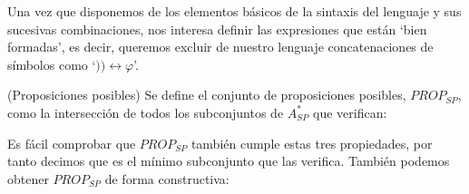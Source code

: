 Una vez que disponemos de los elementos básicos de la sintaxis del lenguaje y sus sucesivas combinaciones, nos interesa definir las expresiones que están `bien formadas', es decir, queremos excluir de nuestro lenguaje  concatenaciones de símbolos como `$)) \leftrightarrow \varphi$'.

\begin{definition}\label{def:PROP_{SP}}(Proposiciones posibles)
Se define el conjunto de proposiciones posibles,  $PROP_{SP}$, como la intersección de todos los subconjuntos de $A_{SP}^*$ que verifican:
\end{definition}
Es fácil comprobar que $PROP_{SP}$ también cumple estas tres propiedades, por tanto decimos que es el mínimo subconjunto que las verifica. También podemos obtener $PROP_{SP}$ de forma constructiva:

